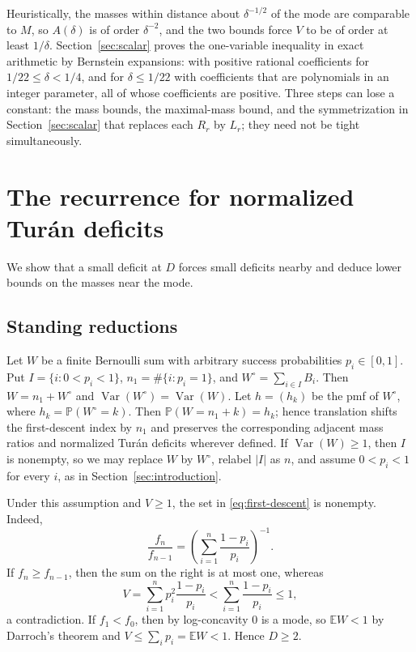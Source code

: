 \documentclass[ECP,preprint]{ejpecp}
\newcommand{\Pp}{\mathbb{P}}
\newcommand{\Var}{\operatorname{Var}}
\begin{document}
Heuristically, the masses within distance about $\delta^{-1/2}$ of the mode
are comparable to $M$, so $A(\delta)$ is of order $\delta^{-2}$, and the two
bounds force $V$ to be of order at least $1/\delta$.
Section~\ref{sec:scalar} proves the one-variable inequality in exact
arithmetic by Bernstein expansions: with positive rational coefficients for
$1/22\leq\delta<1/4$, and for $\delta\leq1/22$ with coefficients that are
polynomials in an integer parameter, all of whose coefficients are positive.
Three steps can lose a constant: the mass bounds, the maximal-mass bound, and
the symmetrization in Section~\ref{sec:scalar} that replaces each $R_r$ by
$L_r$; they need not be tight simultaneously.

\section{The recurrence for normalized Tur\'an deficits}
\label{sec:propagation}

We show that a small deficit at $D$ forces small deficits nearby and deduce
lower bounds on the masses near the mode.

\subsection{Standing reductions}\label{sec:reduction}

Let $W$ be a finite Bernoulli sum with arbitrary success probabilities
$p_i\in[0,1]$. Put
$I=\{i:0<p_i<1\}$,
$n_1=\#\{i:p_i=1\}$, and
$W^\circ=\sum_{i\in I}B_i$. Then $W=n_1+W^\circ$ and
$\Var(W^\circ)=\Var(W)$. Let $h=(h_k)$ be the pmf of $W^\circ$, where
$h_k=\Pp(W^\circ=k)$. Then $\Pp(W=n_1+k)=h_k$; hence translation shifts the
first-descent index by $n_1$ and
preserves the corresponding adjacent mass ratios and normalized Tur\'an
deficits wherever defined. If $\Var(W)\geq1$, then $I$ is nonempty, so we may
replace $W$ by $W^\circ$, relabel $|I|$ as $n$, and assume $0<p_i<1$ for every
$i$, as in Section~\ref{sec:introduction}.

Under this assumption and $V\geq1$, the set in \eqref{eq:first-descent} is
nonempty. Indeed,
\[
  \frac{f_n}{f_{n-1}}
  =\left(\sum_{i=1}^n\frac{1-p_i}{p_i}\right)^{-1}.
\]
If $f_n\geq f_{n-1}$, then the sum on the right is at most one, whereas
\[
  V=\sum_{i=1}^n p_i^2\frac{1-p_i}{p_i}
  <\sum_{i=1}^n\frac{1-p_i}{p_i}\leq1,
\]
a contradiction. If $f_1<f_0$, then by log-concavity $0$ is a mode, so
$\mathbb EW<1$ by Darroch's theorem \cite{darroch1964} and
$V\leq\sum_ip_i=\mathbb EW<1$. Hence $D\geq2$.
\end{document}
